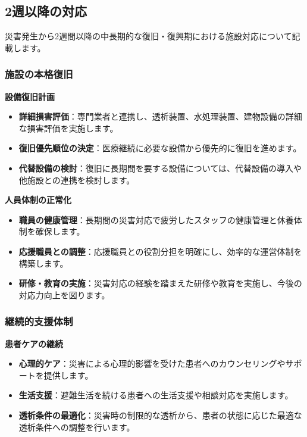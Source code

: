 \documentclass[
  japanese,
  letterpaper,
  DIV=11,
  numbers=noendperiod]{scrartcl}
\providecommand{\tightlist}{%
  \setlength{\itemsep}{0pt}\setlength{\parskip}{0pt}}
\begin{document}
\subsection{2週以降の対応}\label{ux9031ux4ee5ux964dux306eux5bfeux5fdc}

災害発生から2週間以降の中長期的な復旧・復興期における施設対応について記載します。

\subsubsection{施設の本格復旧}\label{ux65bdux8a2dux306eux672cux683cux5fa9ux65e7}

\textbf{設備復旧計画}

\begin{itemize}
\tightlist
\item
  \textbf{詳細損害評価}：専門業者と連携し、透析装置、水処理装置、建物設備の詳細な損害評価を実施します。
\item
  \textbf{復旧優先順位の決定}：医療継続に必要な設備から優先的に復旧を進めます。
\item
  \textbf{代替設備の検討}：復旧に長期間を要する設備については、代替設備の導入や他施設との連携を検討します。
\end{itemize}

\textbf{人員体制の正常化}

\begin{itemize}
\tightlist
\item
  \textbf{職員の健康管理}：長期間の災害対応で疲労したスタッフの健康管理と休養体制を確保します。
\item
  \textbf{応援職員との調整}：応援職員との役割分担を明確にし、効率的な運営体制を構築します。
\item
  \textbf{研修・教育の実施}：災害対応の経験を踏まえた研修や教育を実施し、今後の対応力向上を図ります。
\end{itemize}

\subsubsection{継続的支援体制}\label{ux7d99ux7d9aux7684ux652fux63f4ux4f53ux5236}

\textbf{患者ケアの継続}

\begin{itemize}
\tightlist
\item
  \textbf{心理的ケア}：災害による心理的影響を受けた患者へのカウンセリングやサポートを提供します。
\item
  \textbf{生活支援}：避難生活を続ける患者への生活支援や相談対応を実施します。
\item
  \textbf{透析条件の最適化}：災害時の制限的な透析から、患者の状態に応じた最適な透析条件への調整を行います。
\end{itemize}
\end{document}
